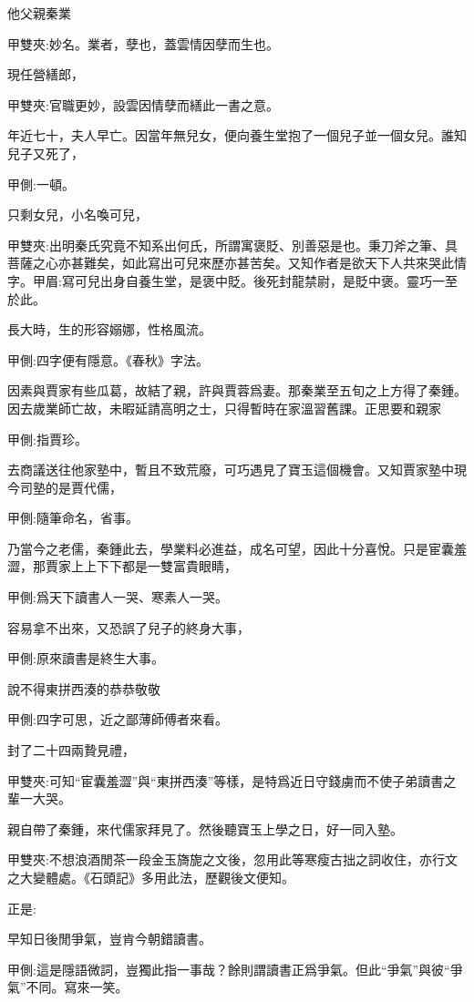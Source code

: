 \begin{parag}
    他父親秦業\begin{note}甲雙夾:妙名。業者，孽也，蓋雲情因孽而生也。\end{note}現任營繕郎，\begin{note}甲雙夾:官職更妙，設雲因情孽而繕此一書之意。\end{note}年近七十，夫人早亡。因當年無兒女，便向養生堂抱了一個兒子並一個女兒。誰知兒子又死了，\begin{note}甲側:一頓。\end{note}只剩女兒，小名喚可兒，\begin{note}甲雙夾:出明秦氏究竟不知系出何氏，所謂寓褒貶、別善惡是也。秉刀斧之筆、具菩薩之心亦甚難矣，如此寫出可兒來歷亦甚苦矣。又知作者是欲天下人共來哭此情字。甲眉:寫可兒出身自養生堂，是褒中貶。後死封龍禁尉，是貶中褒。靈巧一至於此。\end{note}長大時，生的形容嫋娜，性格風流。\begin{note}甲側:四字便有隱意。《春秋》字法。\end{note}因素與賈家有些瓜葛，故結了親，許與賈蓉爲妻。那秦業至五旬之上方得了秦鍾。因去歲業師亡故，未暇延請高明之士，只得暫時在家溫習舊課。正思要和親家\begin{note}甲側:指賈珍。\end{note}去商議送往他家塾中，暫且不致荒廢，可巧遇見了寶玉這個機會。又知賈家塾中現今司塾的是賈代儒，\begin{note}甲側:隨筆命名，省事。\end{note}乃當今之老儒，秦鍾此去，學業料必進益，成名可望，因此十分喜悅。只是宦囊羞澀，那賈家上上下下都是一雙富貴眼睛，\begin{note}甲側:爲天下讀書人一哭、寒素人一哭。\end{note}容易拿不出來，又恐誤了兒子的終身大事，\begin{note}甲側:原來讀書是終生大事。\end{note}說不得東拼西湊的恭恭敬敬\begin{note}甲側:四字可思，近之鄙薄師傅者來看。\end{note}封了二十四兩贄見禮，\begin{note}甲雙夾:可知“宦囊羞澀”與“東拼西湊”等樣，是特爲近日守錢虜而不使子弟讀書之輩一大哭。\end{note}親自帶了秦鍾，來代儒家拜見了。然後聽寶玉上學之日，好一同入塾。\begin{note}甲雙夾:不想浪酒閒茶一段金玉旖旎之文後，忽用此等寒瘦古拙之詞收住，亦行文之大變體處。《石頭記》多用此法，歷觀後文便知。\end{note}正是:
\end{parag}


\begin{poem}
    \begin{pl}早知日後閒爭氣，豈肯今朝錯讀書。\end{pl}
    \begin{note}甲側:這是隱語微詞，豈獨此指一事哉？餘則謂讀書正爲爭氣。但此“爭氣”與彼“爭氣”不同。寫來一笑。\end{note}
\end{poem}